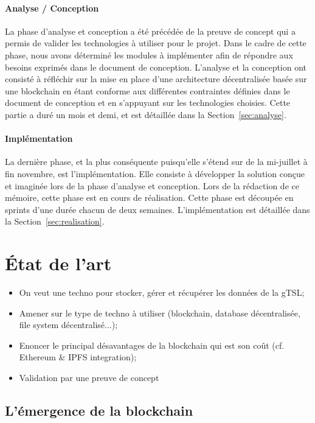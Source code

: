 \documentclass{tnreport}
\begin{document}
\subsubsection{Analyse / Conception}

La phase d'analyse et conception a été précédée de la preuve de concept qui a permis de valider les technologies à utiliser pour le projet. Dans le cadre de cette phase, nous avons déterminé les modules à implémenter afin de répondre aux besoins exprimés dans le document de conception. L'analyse et la conception ont consisté à réfléchir sur la mise en place d'une architecture décentralisée basée sur une blockchain en étant conforme aux différentes contraintes définies dans le document de conception et en s'appuyant sur les technologies choisies. Cette partie a duré un mois et demi, et est détaillée dans la Section~\ref{sec:analyse}.

\subsubsection{Implémentation}

La dernière phase, et la plus conséquente puisqu'elle s'étend sur de la mi-juillet à fin novembre, est l'implémentation. Elle consiste à développer la solution conçue et imaginée lors de la phase d'analyse et conception. Lors de la rédaction de ce mémoire, cette phase est en cours de réalisation. Cette phase est découpée en sprints d'une durée chacun de deux semaines. L'implémentation est détaillée dans la Section~\ref{sec:realisation}. 

\chapter{État de l'art}
\label{sec:state-of-the-art}

\begin{itemize}
	\item On veut une techno pour stocker, gérer et récupérer les données de la gTSL; 
	\item Amener sur le type de techno à utiliser (blockchain, database décentralisée, file system décentralisé...);
	\item Enoncer le principal désavantages de la blockchain qui est son coût (cf. Ethereum \& IPFS integration);
	\item Validation par une preuve de concept
\end{itemize}

\section{L'émergence de la blockchain}
\end{document}
